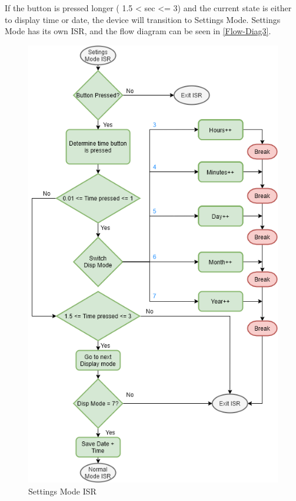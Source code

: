 \\
\\
If the button is pressed longer ( 1.5 < sec <= 3) and the current state is either to display time or date, the device will transition to Settings Mode. Settings Mode has its own ISR, and the flow diagram can be seen in \autoref{Flow-Diag3}.
\begin{figure}[H]
	\centering
	\includegraphics[scale=0.5]{img/Flow-Diag3.png}
	\caption{Settings Mode ISR}
	\label{Flow-Diag3}
\end{figure}
